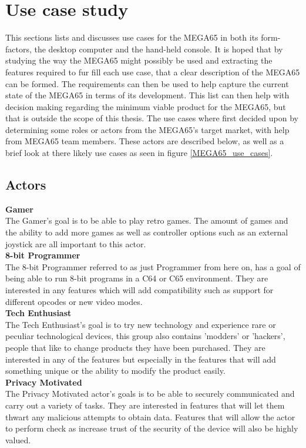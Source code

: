 \section{Use case study}
This sections lists and discusses use cases for the MEGA65 in both its form-factors, the desktop computer and the hand-held console. It is hoped that by studying the way the MEGA65 might possibly be used and extracting the features required to fur fill each use case, that a clear description of the MEGA65 can be formed. The requirements can then be used to help capture the current state of the MEGA65 in terms of its development. This list can then help with decision making regarding the minimum viable product for the MEGA65, but that is outside the scope of this thesis. The use cases where first decided upon by determining some roles or actors from the MEGA65's target market, with help from MEGA65 team members. These actors are described below, as well as a brief look at there likely use cases as seen in figure \ref{MEGA65_use_cases}.

\subsection{Actors}
\textbf{Gamer}\\
The Gamer's goal is to be able to play retro games. The amount of games and the ability to add more games as well as controller options such as an external joystick are all important to this actor.\\

\textbf{8-bit Programmer}\\
The 8-bit Programmer referred to as just Programmer from here on, has a goal of being able to run 8-bit programs in a C64 or C65 environment. They are interested in any features which will add compatibility such as support for different opcodes or new video modes. \\

\textbf{Tech Enthusiast}\\
The Tech Enthusiast's goal is to try new technology and experience rare or peculiar technological devices, this group also contains 'modders' or 'hackers', people that like to change products they have been purchased. They are interested in any of the features but especially in the features that will add something unique or the ability to modify the product easily.\\

\textbf{Privacy Motivated}\\
The Privacy Motivated actor's goals is to be able to securely communicated and carry out a variety of tasks. They are interested in features that will let them thwart any malicious attempts to obtain data. Features that will allow the actor to perform check as increase trust of the security of the device will also be highly valued. \\


